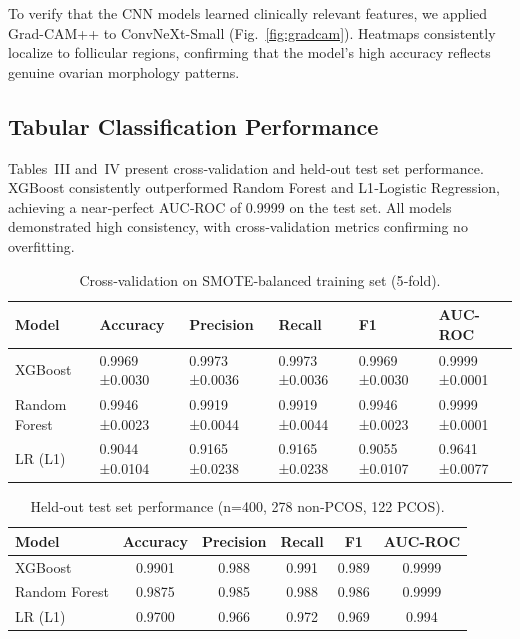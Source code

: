 \documentclass[conference]{IEEEtran}
\begin{document}
To verify that the CNN models learned clinically relevant features, we applied Grad-CAM++ \cite{Chattopadhyay2018} to ConvNeXt-Small (Fig.~\ref{fig:gradcam}). Heatmaps consistently localize to follicular regions, confirming that the model’s high accuracy reflects genuine ovarian morphology patterns.

\subsection{Tabular Classification Performance}

Tables~III and~IV present cross‑validation and held‑out test set performance. XGBoost consistently outperformed Random Forest and L1‑Logistic Regression, achieving a near‑perfect AUC‑ROC of 0.9999 on the test set. All models demonstrated high consistency, with cross‑validation metrics confirming no overfitting.

\begin{table}[htbp]
\caption{Cross‑validation on SMOTE‑balanced training set (5‑fold).}
\centering
\begin{tabular}{p{0.8cm} p{1cm}p{1cm}p{1cm}p{1cm} p{1cm}}
\hline
\textbf{Model} & \textbf{Accuracy} & \textbf{Precision} & \textbf{Recall} & \textbf{F1} & \textbf{AUC-ROC} \\
\hline
XGBoost & 0.9969 ±0.0030 & 0.9973 ±0.0036 & 0.9973 ±0.0036 & 0.9969 ±0.0030 & 0.9999 ±0.0001 \\
Random Forest & 0.9946 ±0.0023 & 0.9919 ±0.0044 & 0.9919 ±0.0044 & 0.9946 ±0.0023 & 0.9999 ±0.0001 \\
LR (L1) & 0.9044 ±0.0104 & 0.9165 ±0.0238 & 0.9165 ±0.0238 & 0.9055 ±0.0107 & 0.9641 ±0.0077 \\
\hline
\end{tabular}
\end{table}

\begin{table}[htbp]
\caption{Held‑out test set performance (n=400, 278 non‑PCOS, 122 PCOS).}
\centering
\begin{tabular}{p{1.5cm}ccccc}
\hline
\textbf{Model} & \textbf{Accuracy} & \textbf{Precision} & \textbf{Recall} & \textbf{F1} & \textbf{AUC-ROC} \\
\hline
XGBoost & 0.9901 & 0.988 & 0.991 & 0.989 & 0.9999 \\
Random Forest & 0.9875 & 0.985 & 0.988 & 0.986 & 0.9999 \\
LR (L1) & 0.9700 & 0.966 & 0.972 & 0.969 & 0.994 \\
\hline
\end{tabular}
\end{table}
\end{document}
